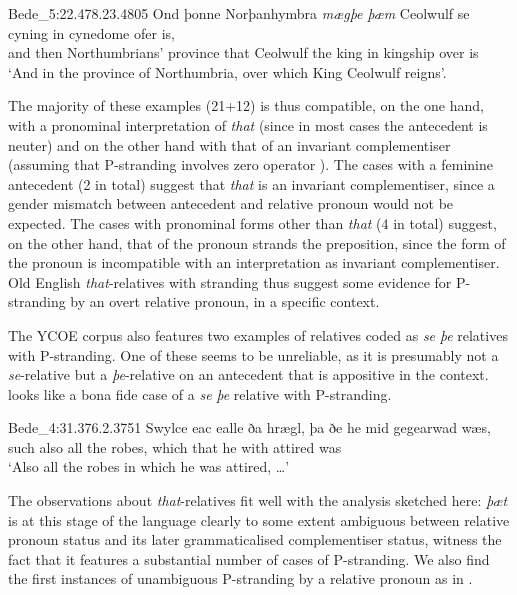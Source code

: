 \documentclass[output=paper]{langsci/langscibook}
\begin{document}
\ea Bede\_5:22.478.23.4805%
    \label{ex:key:11.11}
    \sn
    \gll Ond þonne Norþanhymbra   \textit{mægþe}   \textit{þæm} Ceolwulf se    cyning in cynedome ofer is,   \\
        and then    Northumbrians’ province that   Ceolwulf  the king  in    kingship over is\\
    \glt ‘And in the province of Northumbria, over which King Ceolwulf reigns’.
\z

The majority of these examples (21+12) is thus compatible, on the one hand,
with a pronominal interpretation of \textit{that} (since in most cases the
antecedent is neuter) and on the other hand with that of an invariant
complementiser (assuming that P-stranding involves
zero operator ).  The cases with a feminine antecedent (2 in total)
suggest that \textit{that} is an invariant complementiser, since a gender
mismatch between antecedent and relative pronoun would not be expected. The
cases with pronominal forms other than \textit{that} (4 in total) suggest, on
the other hand, that  of the pronoun strands the preposition, since the
form of the pronoun is incompatible with an interpretation as invariant
complementiser. Old English \textit{that}-relatives with stranding thus suggest
some evidence for P-stranding by an overt relative pronoun, in a specific
context.

The YCOE corpus also features two examples of relatives coded as \textit{se} \textit{þe} relatives with P-stranding. One of these seems to be unreliable, as it is presumably not a \textit{se}-relative but a \textit{þe}-relative on an antecedent that is appositive in the context.  looks like a bona fide case of a \textit{se} \textit{þe} relative with P-stranding.

\ea Bede\_4:31.376.2.3751%
    \label{ex:key:11.13}
    \sn
    \gll Swylce eac ealle ða  hrægl, þa       ðe   he mid gegearwad wæs, \\
        such    also all    the robes, which that he with attired was \\
    \glt ‘Also all the robes in which he was attired, …’
\z

The observations about \emph{that}-relatives fit well with the analysis
sketched here: \textit{þæt} is at this stage of the language clearly to some
extent ambiguous between relative pronoun status and its later grammaticalised
complementiser status, witness the fact that it features a substantial number
of cases of P-stranding. We also find the first
instances of unambiguous P-stranding by a relative pronoun as in
.
\end{document}
